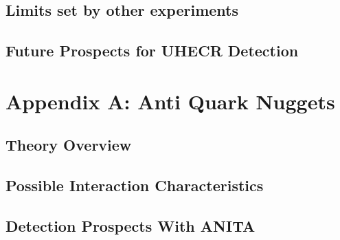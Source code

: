 \documentclass[11pt]{uhthesis}
\begin{document}
\section{Limits set by other experiments}

\section{Future Prospects for UHECR Detection}

\chapter{Appendix A: Anti Quark Nuggets}
\section{Theory Overview}

\section{Possible Interaction Characteristics}

\section{Detection Prospects With ANITA}
	
	
	
\end{document}
